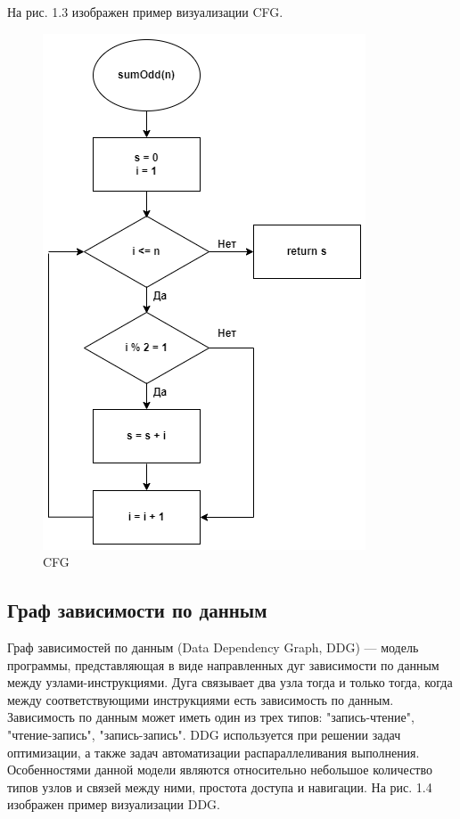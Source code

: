 На рис. 1.3 изображен пример визуализации CFG.
\begin{figure}[h]
	\center
	\includegraphics [scale=0.90] {my_folder/images/my/3}
	\caption{CFG}
	\label{fig:3}  
\end{figure}
\newpage
\subsection{Граф зависимости по данным} \label{ch1:subsec-title-abbr}
Граф зависимостей по данным (Data Dependency Graph, DDG) — модель программы, представляющая в виде направленных дуг зависимости по данным между узлами-инструкциями. Дуга связывает два узла тогда и только тогда, когда между соответствующими инструкциями есть зависимость по данным. Зависимость по данным может иметь один из трех типов: "запись-чтение", "чтение-запись", "запись-запись".
DDG используется при решении задач оптимизации, а также задач автоматизации распараллеливания выполнения. Особенностями данной модели являются относительно небольшое количество типов узлов и связей между ними, простота доступа и навигации.
На рис. 1.4 изображен пример визуализации DDG.

